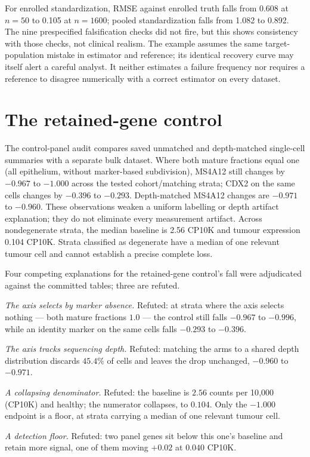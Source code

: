 For enrolled standardization, RMSE against enrolled truth falls from 0.608
at $n=50$ to 0.105 at $n=1600$; pooled standardization falls from 1.082 to
0.892. The nine prespecified falsification checks did not fire, but this
shows consistency with those checks, not clinical realism. The example
assumes the same target-population mistake in estimator and reference;
its identical recovery curve may itself alert a careful analyst. It neither
estimates a failure frequency nor requires a reference to disagree numerically
with a correct estimator on every dataset.

\section{The retained-gene control}
\label{app:controls}
The control-panel audit compares saved unmatched and depth-matched single-cell
summaries with a separate bulk dataset. Where both mature fractions equal
one (all epithelium, without marker-based subdivision), MS4A12 still changes
by $-0.967$ to $-1.000$ across the tested cohort/matching strata; CDX2 on the
same cells changes by $-0.396$ to $-0.293$. Depth-matched MS4A12 changes are
$-0.971$ to $-0.960$. These observations weaken a uniform labelling or depth
artifact explanation; they do not eliminate every measurement artifact.
Across nondegenerate strata, the median baseline is 2.56 CP10K and tumour
expression 0.104 CP10K. Strata classified as degenerate have a median of one
relevant tumour cell and cannot establish a precise complete loss.

Four competing explanations for the retained-gene control's fall were
adjudicated against the committed tables; three are refuted.

\emph{The axis selects by marker absence.} Refuted: at strata where the axis
selects nothing --- both mature fractions $1.0$ --- the control still falls
$-0.967$ to $-0.996$, while an identity marker on the same cells falls
$-0.293$ to $-0.396$.

\emph{The axis tracks sequencing depth.} Refuted: matching the arms to a
shared depth distribution discards $45.4\%$ of cells and leaves the drop
unchanged, $-0.960$ to $-0.971$.

\emph{A collapsing denominator.} Refuted: the baseline is $2.56$ counts per 10{,}000 (CP10K) and
healthy; the numerator collapses, to $0.104$. Only the $-1.000$ endpoint is a
floor, at strata carrying a median of one relevant tumour cell.

\emph{A detection floor.} Refuted: two panel genes sit below this one's
baseline and retain more signal, one of them moving $+0.02$ at $0.040$ CP10K.

